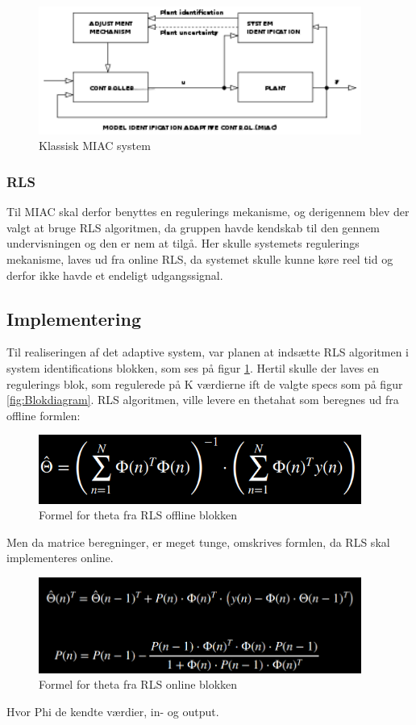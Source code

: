 \begin{figure}[H]
	\centering
	\includegraphics[width = 300pt]{figur/MIAC}
	\caption{Klassisk MIAC system}
	\label{fig:MIAC}
\end{figure}

\subsubsection{RLS}
Til MIAC skal derfor benyttes en regulerings mekanisme, og derigennem blev der valgt at bruge RLS algoritmen, da gruppen havde kendskab til den gennem undervisningen og den er nem at tilgå. Her skulle systemets regulerings mekanisme, laves ud fra online RLS, da systemet skulle kunne køre reel tid og derfor ikke havde et endeligt udgangssignal. 

\subsection{Implementering}
Til realiseringen af det adaptive system, var planen at indsætte RLS algoritmen i system identifications blokken, som ses på figur \ref{fig:MIAC}. Hertil skulle der laves en regulerings blok, som regulerede på K værdierne ift de valgte specs som på figur \ref{fig:Blokdiagram}.
RLS algoritmen, ville levere en thetahat som beregnes ud fra offline formlen:

\begin{figure}[H]
	\centering
	\includegraphics[width = 300pt]{figur/theta_formel}
	\caption{Formel for theta fra RLS offline blokken}
	\label{fig:theta_formel}
\end{figure}
Men da matrice beregninger, er meget tunge, omskrives formlen, da RLS skal implementeres online. 
 \begin{figure}[H]
	\centering
	\includegraphics[width = 300pt]{figur/RLS_formel}
	\caption{Formel for theta fra RLS online blokken}
	\label{fig:RLS_formel}
\end{figure}
Hvor Phi de kendte værdier, in- og output. 

